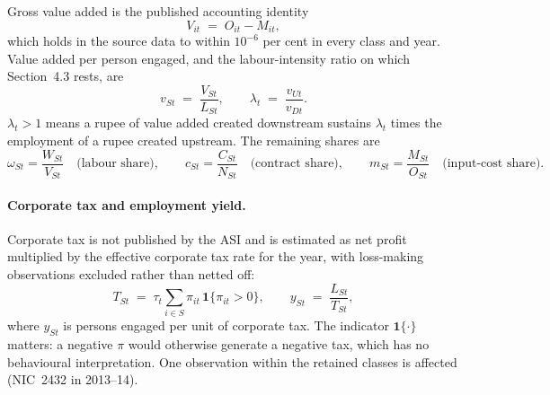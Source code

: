 Gross value added is the published accounting identity
\begin{equation}
    V_{it} \;=\; O_{it} - M_{it},
    \label{eq:gva}
\end{equation}
which holds in the source data to within $10^{-6}$ per cent in every class and
year. Value added per person engaged, and the labour-intensity ratio on which
Section~4.3 rests, are
\begin{equation}
    v_{St} \;=\; \frac{V_{St}}{L_{St}},
    \qquad
    \lambda_t \;=\; \frac{v_{Ut}}{v_{Dt}} .
    \label{eq:lambda}
\end{equation}
$\lambda_t > 1$ means a rupee of value added created downstream sustains
$\lambda_t$ times the employment of a rupee created upstream. The remaining
shares are
\begin{equation}
    \omega_{St} = \frac{W_{St}}{V_{St}}
    \quad\text{(labour share)},
    \qquad
    c_{St} = \frac{C_{St}}{N_{St}}
    \quad\text{(contract share)},
    \qquad
    m_{St} = \frac{M_{St}}{O_{St}}
    \quad\text{(input-cost share)} .
    \label{eq:shares}
\end{equation}

\paragraph{Corporate tax and employment yield.} Corporate tax is not published by
the ASI and is estimated as net profit multiplied by the effective corporate tax
rate for the year, with loss-making observations excluded rather than netted off:
\begin{equation}
    T_{St} \;=\; \tau_t \sum_{i \in S} \pi_{it}\,\mathbf{1}\{\pi_{it} > 0\},
    \qquad
    y_{St} \;=\; \frac{L_{St}}{T_{St}} ,
    \label{eq:tax}
\end{equation}
where $y_{St}$ is persons engaged per unit of corporate tax. The indicator
$\mathbf{1}\{\cdot\}$ matters: a negative $\pi$ would otherwise generate a negative
tax, which has no behavioural interpretation. One observation within the retained
classes is affected (NIC~2432 in 2013--14).

